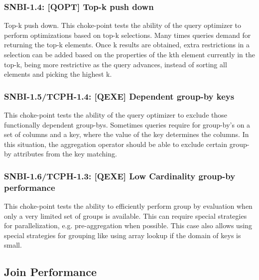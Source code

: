 \subsubsection{SNBI-1.4: [QOPT]  Top-k push down}
\label{choke_point_1.4}
Top-k push down. This choke-point tests the ability of the query optimizer to perform optimizations based on top-k selections. Many times queries demand for returning the top-k elements.
Once k results are obtained, extra restrictions in a selection can be added based on the properties of the kth element currently in the top-k, being more restrictive as the query advances, instead of sorting all elements and picking the highest k.

\subsubsection{SNBI-1.5/TCPH-1.4: [QEXE] Dependent group-by keys}
\label{choke_point_1.5}
This choke-point tests the ability of the query optimizer to exclude those functionally dependent group-bys. Sometimes queries require for group-by's on a set of columns and a key, where the value of the key determines the columns.
In this situation, the aggregation operator should be able to exclude certain group-by attributes from the key matching.

\subsubsection{SNBI-1.6/TCPH-1.3: [QEXE] Low Cardinality group-by performance}
\label{choke_point_1.6}
This choke-point tests the ability to efficiently perform group by evaluation when only a very limited set of groups is available.  This can require special strategies for parallelization, e.g. pre-aggregation when possible. This case also allows using special strategies for grouping like using array lookup if the domain of keys is small.


\subsection{Join Performance}

